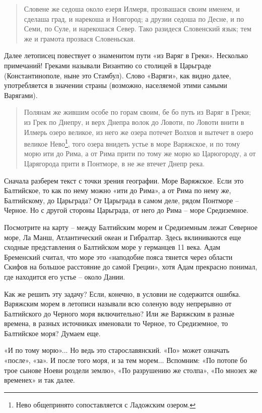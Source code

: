 \begin{quotation}
Словене же седоша около езеря Илмеря, прозвашася своим именем, и сделаша град, и нарекоша и Новгород; а друзии седоша по Десне, и по Семи, по Суле, и нарекошася Север. Тако разидеся Словенский язык; тем же и грамота прозвася Словеньская.
\end{quotation}

Далее летописец повествует о знаменитом пути «из Варяг в Греки». Несколько примечаний! Греками называли Византию со столицей в Царьграде (Константинополе, ныне это Стамбул). Слово «Варяги», как видно далее, употребляется в значении страны (возможно, населяемой этими самыми Варягами). 

\begin{quotation}
Полянам же жившим особе по горам своим, бе бо путь из Варяг в Греки; из Грек по Днепру, и верх Днепра волок до Ловоти, по Ловоти внити в Илмерь озеро великое, из него же озера потечет Волхов и вытечет в озеро великое Нево\footnote{Нево общепринято сопоставляется с Ладожским озером.}, того озера внидеть устье в море Варяжское, и по тому морю ити до Рима, а от Рима прити по тому же морю ко Царюгороду, а от Царягорода прити в Понтморе, в не же втечет Днепр река.
\end{quotation}

Сначала разберем текст с точки зрения географии. Море Варяжское. Если это Балтийское, то как по нему можно «ити до Рима», а от Рима по нему же, Балтийскому, до Царьграда? От Царьграда в самом деле, рядом Понтморе – Черное. Но с другой стороны Царьграда, от него до Рима – море Средиземное.

Посмотрите на карту – между Балтийским морем и Средиземным лежат Северное море, Ла Манш, Атлантический океан и Гибралтар. Здесь вклиниваются еще сходные представления о Балтийском море у германцев 11 века. Адам Бременский считал, что море это «наподобие пояса тянется через области Скифов на большое расстояние до самой Греции», хотя Адам прекрасно понимал, где находится его устье – около Дании.

Как же решить эту задачу? Если, конечно, в условии не содержится ошибка. Варяжским морем в летописи называли всю соленую воду непрерывно от Балтийского до Черного моря включительно? Или же Варяжским в разные времена, в разных источниках именовали то Черное, то Средиземное, то Балтийское моря? Думаем еще. 

«И по тому морю»... Но ведь это старославянский. «По» может означать «после», «за». И после того моря, и за тем морем... Вспомним: «По потопе бо трое сынове Ноеви роздели землю», «По разрушению же столпа», «По мнозех же временех» и так далее.


